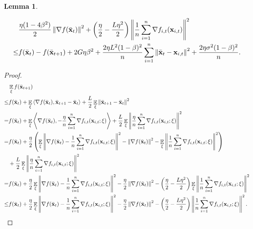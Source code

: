 \documentclass{article}
\newtheorem{Lemma}{\bf{Lemma}}
\begin{document}
\begin{Lemma}
\label{lemma_gradient_norm_bound}

\nonumber
\begin{align}
\nonumber
& \frac{\eta(1-4\beta^2)}{2}\left\lVert\nabla f(\bar{{\bf x}}_t)\right\rVert^2 + \left( \frac{\eta}{2} - \frac{L\eta^2}{2} \right)\left\lVert\frac{1}{n}\sum_{i=1}^n \nabla f_{i,t}({\bf x}_{i,t})\right\rVert^2 \\ \nonumber 
\le & f(\bar{{\bf x}}_t) - f(\bar{{\bf x}}_{t+1}) + 2G\eta\beta^2 +  \frac{2\eta L^2(1-\beta)^2}{n}\sum_{i=1}^n\left\lVert\bar{{\bf x}}_t - {\bf x}_{i,t} \right\rVert^2 + \frac{2\eta\sigma^2(1-\beta)^2}{n}.
\end{align}
\end{Lemma}
\begin{proof}

\begin{align}
\nonumber
& \mathop{\mathbb{E}}_{\xi}f(\bar{{\bf x}}_{t+1}) \\ \nonumber
\le & f(\bar{{\bf x}}_t) + \mathop{\mathbb{E}}_{\xi}\left\langle\nabla f(\bar{{\bf x}}_t), \bar{{\bf x}}_{t+1} - \bar{{\bf x}}_t \right\rangle + \frac{L}{2}\mathop{\mathbb{E}}_{\xi}\left\lVert\bar{{\bf x}}_{t+1} - \bar{{\bf x}}_t\right\rVert^2 \\ \nonumber
= & f(\bar{{\bf x}}_t) + \mathop{\mathbb{E}}_{\xi}\left\langle\nabla f(\bar{{\bf x}}_t), -\frac{\eta}{n}\sum_{i=1}^n \nabla f_{i,t}({\bf x}_{i,t};\xi) \right\rangle + \frac{L}{2} \mathop{\mathbb{E}}_{\xi}\left\lVert\frac{\eta}{n}\sum_{i=1}^n \nabla f_{i,t}({\bf x}_{i,t};\xi)\right\rVert^2 \\ \nonumber
= & f(\bar{{\bf x}}_t) + \frac{\eta}{2}\left( \mathop{\mathbb{E}}_{\xi}\left\lVert\nabla f(\bar{{\bf x}}_t) -\frac{1}{n}\sum_{i=1}^n \nabla f_{i,t}({\bf x}_{i,t};\xi)\right\rVert^2 - \left\lVert\nabla f(\bar{{\bf x}}_t)\right\rVert^2 - \mathop{\mathbb{E}}_{\xi}\left\lVert\frac{1}{n}\sum_{i=1}^n \nabla f_{i,t}({\bf x}_{i,t};\xi)\right\rVert^2  \right) \\ \nonumber 
& + \frac{L}{2}\mathop{\mathbb{E}}_{\xi}\left\lVert\frac{\eta}{n}\sum_{i=1}^n \nabla f_{i,t}({\bf x}_{i,t};\xi)\right\rVert^2 \\ \nonumber
= & f(\bar{{\bf x}}_t) + \frac{\eta}{2}\mathop{\mathbb{E}}_{\xi}\left\lVert\nabla f(\bar{{\bf x}}_t) -\frac{1}{n}\sum_{i=1}^n \nabla f_{i,t}({\bf x}_{i,t};\xi)\right\rVert^2 - \frac{\eta}{2}\left\lVert\nabla f(\bar{{\bf x}}_t)\right\rVert^2 - \left( \frac{\eta}{2} - \frac{L\eta^2}{2} \right)\mathop{\mathbb{E}}_{\xi}\left\lVert\frac{1}{n}\sum_{i=1}^n \nabla f_{i,t}({\bf x}_{i,t};\xi)\right\rVert^2 \\ \label{equa_lemma_norm_gradient_square}
\le & f(\bar{{\bf x}}_t) + \frac{\eta}{2}\mathop{\mathbb{E}}_{\xi}\left\lVert\nabla f(\bar{{\bf x}}_t) -\frac{1}{n}\sum_{i=1}^n \nabla f_{i,t}({\bf x}_{i,t};\xi)\right\rVert^2 - \frac{\eta}{2}\left\lVert\nabla f(\bar{{\bf x}}_t)\right\rVert^2 - \left( \frac{\eta}{2} - \frac{L\eta^2}{2} \right)\left\lVert\frac{1}{n}\sum_{i=1}^n \nabla f_{i,t}({\bf x}_{i,t};\xi)\right\rVert^2.
\end{align} 


\end{proof}
\end{document}
